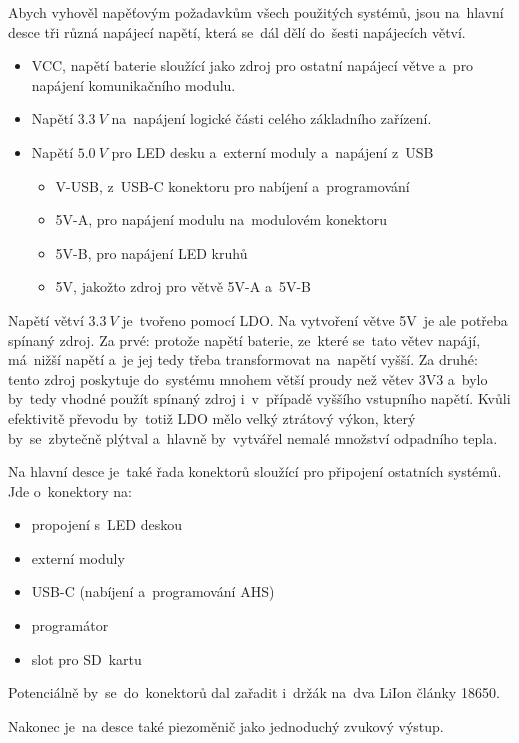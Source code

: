 \newpage
Abych vyhověl napěťovým požadavkům všech použitých systémů, jsou na~hlavní desce tři různá napájecí napětí, která se~dál dělí do~šesti napájecích větví.
\begin{itemize}
    \item VCC, napětí baterie sloužící jako zdroj pro ostatní napájecí větve a~pro napájení komunikačního modulu. 
    \item Napětí \(3.3~V\) na~napájení logické části celého základního zařízení.
    \item Napětí \(5.0~V\) pro LED desku a~externí moduly a~napájení z~USB
    \begin{itemize}
        \item V-USB, z~USB-C konektoru pro nabíjení a~programování
        \item 5V-A, pro napájení modulu na~modulovém konektoru
        \item 5V-B, pro napájení LED kruhů
        \item 5V, jakožto zdroj pro větvě 5V-A a~5V-B 
    \end{itemize}
\end{itemize}
Napětí větví \(3.3~V\) je~tvořeno pomocí LDO.
Na vytvoření větve 5V~je ale potřeba spínaný zdroj.
Za prvé: protože napětí baterie, ze~které se~tato větev napájí, má~nižší napětí a~je jej tedy třeba transformovat na~napětí vyšší.
Za druhé: tento zdroj poskytuje do~systému mnohem větší proudy než větev 3V3 a~bylo by~tedy vhodné použít spínaný zdroj i~v~případě vyššího vstupního napětí.
Kvůli efektivitě převodu by~totiž LDO mělo velký ztrátový výkon, který by~se~zbytečně plýtval a~hlavně by~vytvářel nemalé množství odpadního tepla.

Na hlavní desce je~také řada konektorů sloužící pro připojení ostatních systémů.
Jde o~konektory na:
\begin{itemize}
    \item propojení s~LED deskou                %
    \item externí moduly                        %
    \item USB-C (nabíjení a~programování AHS)   %
    \item programátor                           %
    \item slot pro SD~kartu
\end{itemize}
Potenciálně by~se~do~konektorů dal zařadit i~držák na~dva LiIon články 18650.

Nakonec je~na desce také piezoměnič jako jednoduchý zvukový výstup.

